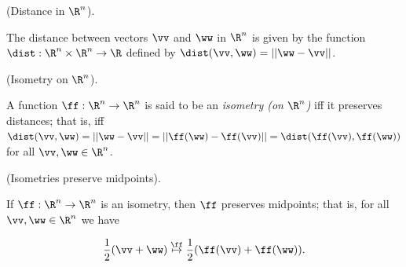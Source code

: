 \begin{defn}
	(Distance in $\R^n$).
	
	The distance between vectors $\vv$ and $\ww$ in $\R^n$ is given by the function $\dist:\R^n \times \R^n \rightarrow \R$ defined by $\dist(\vv, \ww) = ||\ww - \vv||$.
\end{defn}

\begin{defn}
	(Isometry on $\R^n$).
	
	A function $\ff:\R^n \rightarrow \R^n$ is said to be an \textit{isometry (on $\R^n$)} iff it preserves distances; that is, iff $\dist(\vv, \ww) = ||\ww - \vv|| = ||\ff(\ww) - \ff(\vv)|| = \dist(\ff(\vv), \ff(\ww))$ for all $\vv, \ww \in \R^n$.
\end{defn}

\begin{lemma}
	\label{ch::lin_alg::lemma::isometries_preserve_midpoints}
	(Isometries preserve midpoints).
	
	If $\ff:\R^n \rightarrow \R^n$ is an isometry, then $\ff$ preserves midpoints; that is, for all $\vv, \ww \in \R^n$ we have
	
	\begin{align*}
		\frac{1}{2}(\vv + \ww) \overset{\ff}{\mapsto} \frac{1}{2}(\ff(\vv) + \ff(\ww)).
	\end{align*}
\end{lemma}

